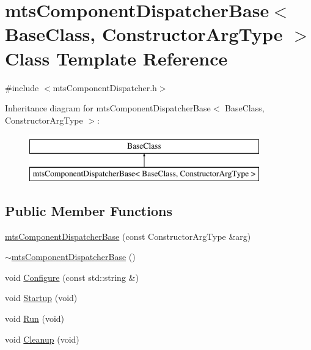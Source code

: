 \hypertarget{classmts_component_dispatcher_base}{\section{mts\-Component\-Dispatcher\-Base$<$ Base\-Class, Constructor\-Arg\-Type $>$ Class Template Reference}
\label{classmts_component_dispatcher_base}
}


{\ttfamily \#include $<$mts\-Component\-Dispatcher.\-h$>$}

Inheritance diagram for mts\-Component\-Dispatcher\-Base$<$ Base\-Class, Constructor\-Arg\-Type $>$\-:\begin{figure}[H]
\begin{center}
\leavevmode
\includegraphics[height=2.000000cm]{d7/ddc/classmts_component_dispatcher_base}
\end{center}
\end{figure}
\subsection*{Public Member Functions}
\begin{DoxyCompactItemize}
\item 
\hyperlink{classmts_component_dispatcher_base_a7c7e1d62fd0624cb6cfa68d2f19e9ad6}{mts\-Component\-Dispatcher\-Base} (const Constructor\-Arg\-Type \&arg)
\item 
\hyperlink{classmts_component_dispatcher_base_a6c8fa4889c53b76598f46d7907744d8a}{$\sim$mts\-Component\-Dispatcher\-Base} ()
\item 
void \hyperlink{classmts_component_dispatcher_base_a3bab233437add8ea246931354221157a}{Configure} (const std\-::string \&)
\item 
void \hyperlink{classmts_component_dispatcher_base_a5f99bc60e13834fc91e7dbc4815717aa}{Startup} (void)
\item 
void \hyperlink{classmts_component_dispatcher_base_a0fa8f5eb16dd1bf2ff78ab084f5cc481}{Run} (void)
\item 
void \hyperlink{classmts_component_dispatcher_base_aafe11720b39031ce5548698838005d07}{Cleanup} (void)
\end{DoxyCompactItemize}


